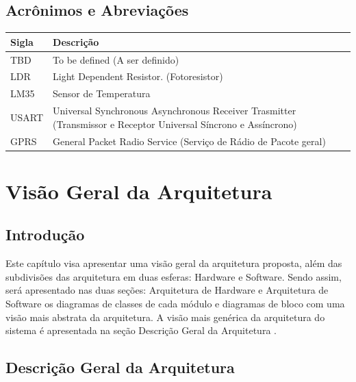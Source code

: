 \documentclass{report}
\begin{document}
  \section{Acrônimos e Abreviações}
    \FloatBarrier
    \begin{table}[H]
      \begin{center}
        \begin{tabular}[pos]{|m{2cm} | m{12cm}|} 
          \hline
          \cellcolor[gray]{0.9}\textbf{Sigla} & \cellcolor[gray]{0.9}\textbf{Descrição} \\ \hline
          TBD      &  To be defined (A ser definido)  \\ \hline
          LDR & Light Dependent Resistor. (Fotoresistor) \\ \hline 
          LM35 & Sensor de Temperatura \\ \hline
          USART & Universal Synchronous Asynchronous Receiver Trasmitter (Transmissor e Receptor Universal Síncrono e Assíncrono)\\ \hline 
          GPRS & General Packet Radio Service (Serviço de Rádio de Pacote geral) \\ \hline
        \end{tabular}
      \end{center}
    \end{table}  

\chapter{Visão Geral da Arquitetura}

  \section{Introdução}
   
      Este capítulo visa apresentar uma visão geral da arquitetura proposta, além das subdivisões das arquitetura em duas esferas: Hardware e Software. Sendo assim, será apresentado 
    nas duas seções: Arquitetura de Hardware e Arquitetura de Software os diagramas de classes de cada módulo e diagramas de bloco com uma visão mais abstrata da arquitetura. A visão 
    mais genérica da arquitetura do sistema é apresentada na seção Descrição Geral da Arquitetura .
    
   \section{Descrição Geral da Arquitetura} 
   
\end{document}
